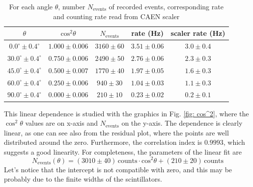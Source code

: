 \documentclass[a4paper]{article}
\begin{document}
\begin{table}[H] 
    \centering
    \begin{tabular}{|c|cccc|}
        \hline
        $\theta$ &  $\mathrm{cos}^2\theta$ & $N_{\mathrm{events}}$ & rate (Hz)&scaler rate (Hz) \\
        \hline
        $0.0^\circ\pm0.4^\circ$  & $1.000\pm 0.006$ & $3160\pm 60$ &$3.51\pm0.06$ &$3.0\pm0.4$ \\
        $30.0^\circ\pm0.4^\circ$ & $0.750\pm0.006$ & $2490\pm50$& $2.76\pm0.06$&$2.3\pm0.3$\\
        $45.0^\circ\pm0.4^\circ$ & $0.500\pm0.007$ & $1770\pm40$&$1.97\pm0.05$ &$1.6\pm0.3$\\
        $60.0^\circ\pm0.4^\circ$ & $0.250 \pm0.006$ & $940\pm30$&$1.04\pm0.03$ &$1.1\pm0.3$\\
        $90.0^\circ\pm0.4^\circ$ & $0.000 \pm0.006$ & $210\pm10$ & $0.23\pm0.02$ &$0.2\pm0.1$\\
        \hline
    \end{tabular}
    \caption{For each angle $\theta$, number $N_\mathrm{events}$ of recorded events, corresponding rate 
 and counting rate read from CAEN scaler }
    \label{tab:cos^2}
\end{table}



This linear dependence is studied with the graphics in Fig. \ref{fig: cos^2}, where the $\cos^2 \theta$ values are on x-axis and $N_\mathrm{events}$ on the y-axis. The dependence is clearly linear, as one can see also from the residual plot, where the points are well distributed around the zero. Furthermore, the correlation index is $0.9993$, which suggests a good linearity. For completeness, the parameters of the linear fit are  
$$N_\mathrm{events}(\theta) = (3010 \pm 40)\, \mathrm{counts} \cdot \mathrm{cos}^2 \theta + (210 \pm20)\,\mathrm{counts}$$
Let's notice that the intercept is not compatible with zero, and this may be probably due to the finite widths of the scintillators.
\end{document}
